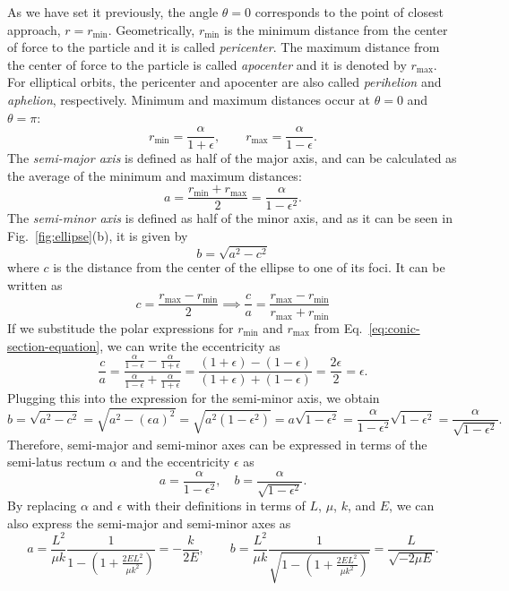 \documentclass[12pt]{article}
\begin{document}
As we have set it previously, the angle $\theta=0$ corresponds to the point of closest approach, $r=r_{\min}$. Geometrically, $r_{\min}$ is the minimum distance from the center of force to the particle and it is called \emph{pericenter}. The maximum distance from the center of force to the particle is called \emph{apocenter} and it is denoted by $r_{\max}$. For elliptical orbits, the pericenter and apocenter are also called \emph{perihelion} and \emph{aphelion}, respectively. Minimum and maximum distances occur at $\theta = 0$ and $\theta = \pi$:
\[
r_\text{min} = \frac{\alpha}{1+\epsilon},\qquad r_\text{max} = \frac{\alpha}{1-\epsilon}.
\]
The \emph{semi-major axis} is defined as half of the major axis, and can be calculated as the average of the minimum and maximum distances:
\[
a = \frac{r_\text{min}+r_\text{max}}{2} = \frac{\alpha}{1-\epsilon^2}.
\]
The \emph{semi-minor axis} is defined as half of the minor axis, and as it can be seen in Fig.~\ref{fig:ellipse}(b), it is given by
\[
b = \sqrt{a^2-c^2}
\]
where $c$ is the distance from the center of the ellipse to one of its foci. It can be written as
\[
c=\frac{r_\text{max}-r_\text{min}}{2} \implies \frac{c}{a} = \frac{r_\text{max}-r_\text{min}}{r_\text{max}+r_\text{min}}
\]
If we substitude the polar expressions for $r_\text{min}$ and $r_\text{max}$ from Eq.~\ref{eq:conic-section-equation}, we can write the eccentricity as
\[
\frac{c}{a} = \frac{\frac{\alpha}{1-\epsilon}-\frac{\alpha}{1+\epsilon}}{\frac{\alpha}{1-\epsilon}+\frac{\alpha}{1+\epsilon}} = \frac{(1+\epsilon)-(1-\epsilon)}{(1+\epsilon)+(1-\epsilon)} = \frac{2\epsilon}{2} = \epsilon.
\]
Plugging this into the expression for the semi-minor axis, we obtain
\[b = \sqrt{a^2-c^2} = \sqrt{a^2-(\epsilon a)^2} = \sqrt{a^2(1-\epsilon^2)} = a\sqrt{1-\epsilon^2} = \frac{\alpha}{1-\epsilon^2}\sqrt{1-\epsilon^2} = \frac{\alpha}{\sqrt{1-\epsilon^2}}.\]
Therefore, semi-major and semi-minor axes can be expressed in terms of the semi-latus rectum $\alpha$ and the eccentricity $\epsilon$ as
\begin{equation}
a = \frac{\alpha}{1-\epsilon^2}, \quad b = \frac{\alpha}{\sqrt{1-\epsilon^2}}.
\label{eq:semi-axes}
\end{equation}
By replacing $\alpha$ and $\epsilon$ with their definitions in terms of $L$, $\mu$, $k$, and $E$, we can also express the semi-major and semi-minor axes as
\[
a = \frac{L^2}{\mu k}\frac{1}{1-\left(1+\frac{2EL^2}{\mu k^2}\right)} = -\frac{k}{2E}, \qquad b = \frac{L^2}{\mu k}\frac{1}{\sqrt{1-\left(1+\frac{2EL^2}{\mu k^2}\right)}} = \frac{L}{\sqrt{-2\mu E}}.
\]
\end{document}
